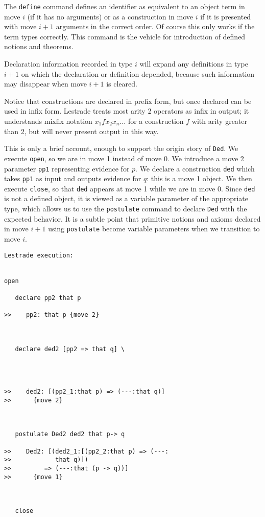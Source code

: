 \documentclass[12pt]{article}
\begin{document}
The {\tt define} command defines an identifier as equivalent to an object term in move $i$ (if it has no arguments) or as a construction in move $i$ if it is presented with
move $i+1$ arguments in the correct order.   Of course this only works if the term types correctly.  This command is the vehicle for introduction of defined notions and theorems.

Declaration information recorded in type $i$ will expand any definitions in type $i+1$ on which the declaration or definition depended, because such information may disappear
when move $i+1$ is cleared.

Notice that constructions are declared in prefix form, but once declared can be used in infix form.  Lestrade treats most arity 2 operators as infix in output;  it understands mixfix notation $x_1 f x_2 x_n\ldots$ for a construction $f$ with arity greater than 2, but will never present output in this way.

This is only a brief account, enough to support the origin story of {\tt Ded}.  We execute {\tt open}, so we are in move 1 instead of move 0.  We introduce a move 2
parameter {\tt pp1} representing evidence for $p$.  We declare a construction {\tt ded} which takes {\tt pp1} as input and outputs evidence for $q$:  this is a move 1 object.
We then execute {\tt close}, so that {\tt ded} appears at move 1 while we are in move 0.  Since {\tt ded} is not a defined object, it is viewed as a variable parameter of the appropriate type,
which allows us to use the {\tt postulate} command to declare {\tt Ded} with the expected behavior.  It is a subtle point that primitive notions and axioms declared in move $i+1$ using
{\tt postulate} become variable parameters when we transition to move $i$.

\begin{verbatim}Lestrade execution:


open

   declare pp2 that p

>>    pp2: that p {move 2}



   declare ded2 [pp2 => that q] \
      



>>    ded2: [(pp2_1:that p) => (---:that q)]
>>      {move 2}



   postulate Ded2 ded2 that p-> q

>>    Ded2: [(ded2_1:[(pp2_2:that p) => (---:
>>            that q)])
>>         => (---:that (p -> q))]
>>      {move 1}



   close
\end{verbatim}
\end{document}
